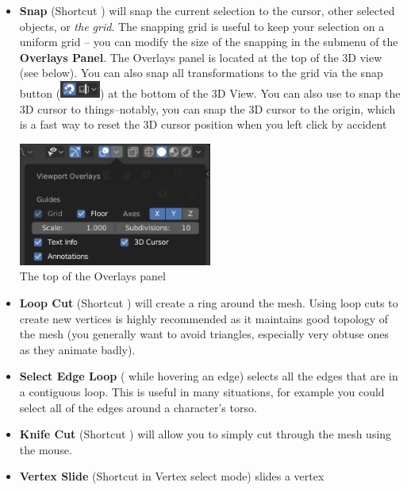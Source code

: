 \documentclass[11pt]{article}
\begin{document}
\begin{itemize}
    \item \textbf{Snap} (Shortcut ) will snap the current selection to the cursor,
    other selected objects, or \textit{the grid}.  The snapping grid is useful to keep your selection
    on a uniform grid -- you can modify the size of the snapping in the  submenu of
    the {\bf Overlays Panel}.  The Overlays panel is located at the top of the 3D view (see below).
    You can also snap all transformations to the grid via the
    snap button (\includegraphics[height=1.5em]{snap-settings}) at the bottom of the 3D View.
    You can also use  to snap the 3D cursor to things--notably, you can snap the 3D
    cursor to the origin, which is a fast way to reset the 3D cursor position when you left click
    by accident \faMehO
    \begin{center}
        \begin{samepage}
        \includegraphics[width=0.5\textwidth]{overlays}\\
        The top of the Overlays panel
        \end{samepage}
    \end{center}
    \item \textbf{Loop Cut} (Shortcut ) will create a ring around the mesh.  Using
    loop cuts to create new vertices is highly recommended as it maintains good topology of the mesh
    (you generally want to avoid triangles, especially very obtuse ones as they animate badly).
    \item \textbf{Select Edge Loop} ( while hovering an edge) selects 
    all the edges that are in a contiguous loop.  This is useful in many situations, for example you
    could select all of the edges around a character's torso.
    \item \textbf{Knife Cut} (Shortcut ) will allow you to simply cut through the mesh using
    the mouse.
    \item \textbf{Vertex Slide} (Shortcut   in Vertex select mode) slides a vertex

\end{itemize}
\end{document}
